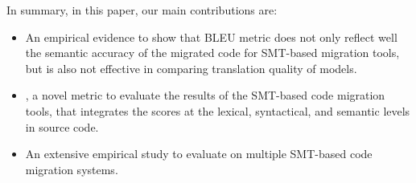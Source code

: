 
In summary, in this paper, our main contributions are:

\begin{itemize}
	\item An empirical evidence to show that BLEU metric does not only reflect
well the semantic accuracy of the migrated code for SMT-based
migration tools, but is also not effective in comparing translation 
quality of models.

	\item {\model}, a novel metric to evaluate the results of the SMT-based
code migration tools, that integrates the scores at the lexical,
syntactical, and semantic levels in source code.

	\item An extensive empirical study to evaluate {\model} on multiple SMT-based code migration systems. 
\end{itemize}







